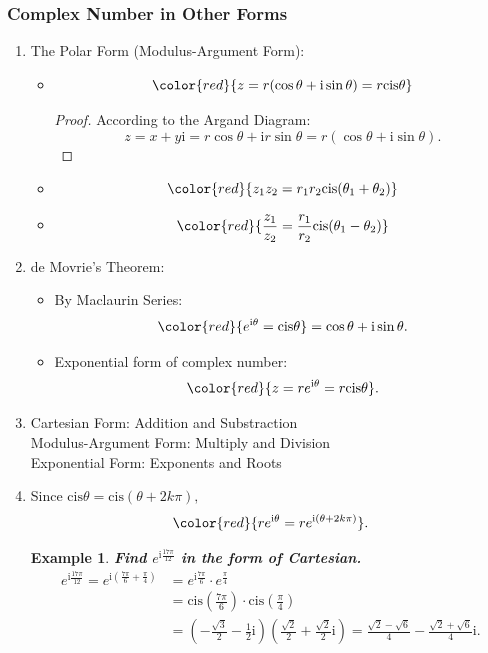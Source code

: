 \documentclass[12pt, a4paper]{article}
\newtheorem{example}{Example}[subsection]
\newtheorem{proof}{Proof}[subsection]
\def\i{{\mathrm{i}}}
\def\cis{\mathrm{cis}}
\begin{document}
\subsubsection{Complex Number in Other Forms}
\begin{enumerate}
  \item The Polar Form (Modulus-Argument Form): 
  \begin{itemize}
    \item $${\color{red}{z=r(\cos\theta+\i\sin\theta)=r\cis\theta}}$$
    \begin{proof}
      According to the Argand Diagram: 
      $$z=x+y\i=r\cos\theta+\i r\sin\theta=r(\cos\theta+\i\sin\theta).$$
    \end{proof}
    \item $${\color{red}{z_1z_2=r_1r_2\cis(\theta_1+\theta_2)}}$$
    \item $${\color{red}{\frac{z_1}{z_2}=\frac{r_1}{r_2}\cis(\theta_1-\theta_2)}}$$
  \end{itemize}
  \item de Movrie's Theorem: 
  \begin{itemize}
    \item By Maclaurin Series: $${\color{red}{e^{\i\theta}=\cis\theta}}=\cos\theta+\i\sin\theta.$$
    \item Exponential form of complex number: 
    $${\color{red}{z=re^{\i\theta}=r\cis\theta}}.$$
  \end{itemize}
  \item Cartesian Form: Addition and Substraction\\
  Modulus-Argument Form: Multiply and Division\\
  Exponential Form: Exponents and Roots
  \item Since $\cis\theta=\cis(\theta+2k\pi),$ 
  $${\color{red}{re^{\i\theta}=re^{\i(\theta+2k\pi)}}}.$$
  \begin{example}
    \textbf{Find $e^{\i\frac{17\pi}{12}}$ in the form of Cartesian.}
    $$\begin{aligned}
      e^{\i\frac{17\pi}{12}}=e^{\i\left(\frac{7\pi}{6}+\frac{\pi}{4}\right)}&=e^{\i\frac{7\pi}{6}}\cdot e^{\frac{\pi}{4}}\\
      &=\cis\left(\frac{7\pi}{6}\right)\cdot\cis\left(\frac{\pi}{4}\right)\\
      &=\left(-\frac{\sqrt{3}}{2}-\frac{1}{2}\i\right)\left(\frac{\sqrt{2}}{2}+\frac{\sqrt{2}}{2}\i\right)=\frac{\sqrt{2}-\sqrt{6}}{4}-\frac{\sqrt{2}+\sqrt{6}}{4}\i.
    \end{aligned}$$
  \end{example}
\end{enumerate}
\end{document}
